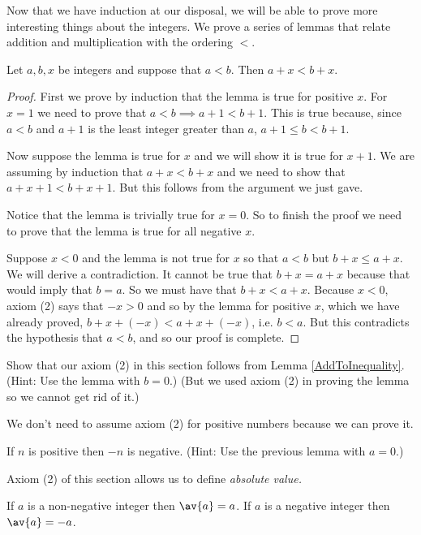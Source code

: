 \documentclass[oneside,12pt]{amsart}
\begin{document}
Now that we have induction at our disposal, we will be able to prove more interesting
things about the integers. We prove a series of lemmas that relate addition and multiplication with the ordering $<$.

\begin{lemma}
\label{AddToInequality}
Let $a,b,x$ be integers and suppose that $a<b$. Then $a+x < b+x$.
\end{lemma}
\begin{proof}
First we prove by induction that the lemma is true for positive $x$. For $x=1$
we need to prove that
$a<b\implies a+1 < b+1.$
This is true because, since $a<b$ and $a+1$ is the least integer greater than $a$,
$a+1\leq b < b+1$.

Now suppose the lemma is true for $x$ and we will show it is true for $x+1$.
We are assuming by induction that $a+x<b+x$ and we need to show that $a+x+1<b+x+1$.
But this follows from the argument we just gave.

Notice that the lemma is trivially true for $x=0$. So to finish the proof we need to prove that
the lemma is true for all negative $x$.

Suppose $x<0$ and the lemma is not true for $x$ so that $a<b$ but $b+x \leq a+x$.
We will derive a contradiction.
It cannot be true that $b+x=a+x$ because that would imply that $b=a$. So we must have
that $b+x < a+x$. Because $x<0$, axiom (2) says that $-x>0$ and so by the lemma for positive $x$, which
we have already proved, $b+x+(-x) < a+x+(-x)$, i.e. $b<a$. But this contradicts
the hypothesis that $a<b$, and so our proof is complete.
\end{proof}

\begin{homework}
Show that our axiom (2) in this section follows from Lemma \ref{AddToInequality}.
(Hint: Use the lemma with $b=0$.) (But we used axiom (2) in proving the lemma
so we cannot get rid of it.)
\end{homework}

We don't need to assume axiom (2) for positive numbers because we can prove it.

\begin{homework}
If $n$ is positive then $-n$ is negative.
(Hint: Use the previous lemma with $a=0$.)
\end{homework}

Axiom (2) of this section allows us to define \emph{absolute value.}

\begin{definition}
If $a$ is a non-negative integer then $\av{a} = a$. If $a$ is a negative integer
then $\av{a} = -a$.
\end{definition}
\end{document}
